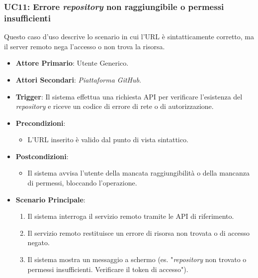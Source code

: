 \documentclass[12pt, a4paper]{article}
\begin{document}
\subsubsection{UC11: Errore \textit{repository} non raggiungibile o permessi insufficienti}\label{uc:11}
Questo caso d'uso descrive lo scenario in cui l'URL è sintatticamente corretto, ma il server remoto nega l'accesso o non trova la risorsa.
\begin{itemize}
    \item \textbf{Attore Primario}: Utente Generico.
    \item \textbf{Attori Secondari}: \textit{Piattaforma GitHub}.
    \item \textbf{Trigger}: Il sistema effettua una richiesta API per verificare l'esistenza del \textit{repository} e riceve un codice di errore di rete o di autorizzazione.
    \item \textbf{Precondizioni}:\begin{itemize}\item L'URL inserito è valido dal punto di vista sintattico.\end{itemize}
    \item \textbf{Postcondizioni}:\begin{itemize}\item Il sistema avvisa l'utente della mancata raggiungibilità o della mancanza di permessi, bloccando l'operazione.\end{itemize}
    \item \textbf{Scenario Principale}:
    \begin{enumerate}
        \item Il sistema interroga il servizio remoto tramite le API di riferimento.
        \item Il servizio remoto restituisce un errore di risorsa non trovata o di accesso negato.
        \item Il sistema mostra un messaggio a schermo (es. "\textit{repository} non trovato o permessi insufficienti. Verificare il token di accesso").
    \end{enumerate}
\end{itemize}
\end{document}
